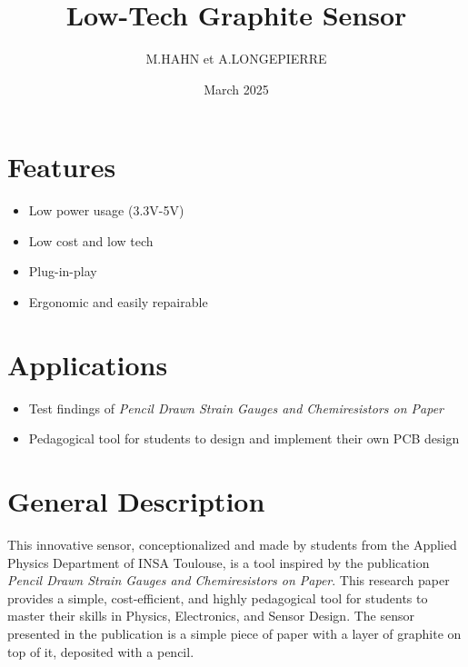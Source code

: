\documentclass[10pt]{datasheet}
\title{Low-Tech Graphite Sensor}
\author{M.HAHN et A.LONGEPIERRE}
\date{March 2025}
\begin{document}
\maketitle


\section{Features}

\begin{itemize}
\item{Low power usage (3.3V-5V)}
\item{Low cost and low tech}
\item{Plug-in-play}
\item{Ergonomic and easily repairable}
\end{itemize}

\section{Applications}

\begin{itemize}
\item{Test findings of \it{Pencil Drawn Strain Gauges and Chemiresistors on Paper}\footnotemark{}}
\item{Pedagogical tool for students to design and implement their own PCB design}
\end{itemize}

\section{General Description}
This innovative sensor, conceptionalized and made by students from the Applied Physics Department of INSA Toulouse, is a tool inspired by the publication 
\textit{Pencil Drawn Strain Gauges and Chemiresistors on Paper}\footnotemark[\value{footnote}]. This research paper provides a simple, cost-efficient, and highly pedagogical tool for students 
to master their skills in Physics, Electronics, and Sensor Design. The sensor presented in the publication is a simple piece of paper with a layer of graphite 
on top of it, deposited with a pencil. 
\end{document}
